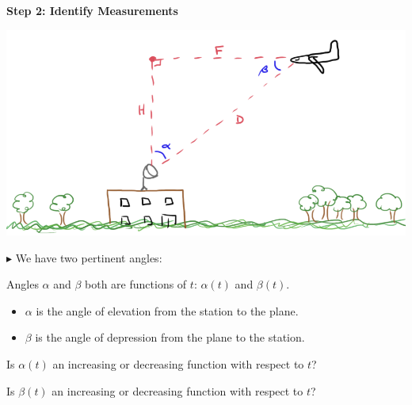 \documentclass{ximera}
\begin{document}
\textbf{\textcolor{purple!85!blue}{Step 2: Identify Measurements}}



\begin{image}
\includegraphics{pics/plane_3.png}
\end{image}










$\blacktriangleright$ We have two pertinent angles:

Angles $\alpha$ and $\beta$ both are functions of $t$: $\alpha(t)$ and $\beta(t)$.




\begin{itemize}
\item $\alpha$ is the angle of elevation from the station to the plane.
\item $\beta$ is the angle of depression from the plane to the station.
\end{itemize}








\begin{question} 


Is $\alpha(t)$ an increasing or decreasing function with respect to $t$?

\begin{multipleChoice}
\end{multipleChoice}

\end{question}








\begin{question} 


Is $\beta(t)$ an increasing or decreasing function with respect to $t$?

\begin{multipleChoice}
\end{multipleChoice}

\end{question}
\end{document}
